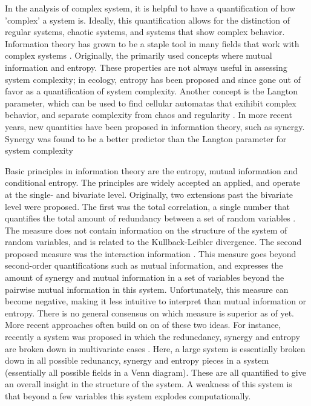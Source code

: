 \documentclass[../main.tex]{subfiles}
\begin{document}
In the analysis of complex system, it is helpful to have a quantification of how 'complex' a system is.
Ideally, this quantification allows for the distinction of regular systems, chaotic systems, and systems that show complex behavior.
Information theory has grown to be a staple tool in many fields that work with complex systems \cite{williams2010nonnegative}. %
Originally, the primarily used concepts where mutual information and entropy.
These properties are not always useful in assessing system complexity; in ecology, entropy has been proposed and since gone out of favor as a quantification of system complexity.
Another concept is the Langton parameter, which can be used to find cellular automatas that exihibit complex behavior, and separate complexity from chaos and regularity \cite{langton1990computation}.
In more recent years, new quantities have been proposed in information theory, such as synergy.
Synergy was found to be a better predictor than the Langton parameter for system complexity \cite{9999QuaxChli}

Basic principles in information theory are the entropy, mutual information and conditional entropy.
The principles are widely accepted an applied, and operate at the single- and bivariate level.
Originally, two extensions past the bivariate level were proposed.
The first was the total correlation, a single number that quantifies the total amount of redundancy between a set of random variables \cite{watanabe1960information}. 
The measure does not contain information on the structure of the system of random variables, and is related to the Kullback-Leibler divergence.
The second proposed measure was the interaction information \cite{mcgill1954multivariate}. This measure goes beyond second-order quantifications such as mutual information, and expresses the amount of synergy and mutual information in a set of variables beyond the pairwise mutual information in this system. 
Unfortunately, this measure can become negative, making it less intuitive to interpret than mutual information or entropy.
There is no general consensus on which measure is superior as of yet\cite{williams2010nonnegative}.
More recent approaches often build on on of these two ideas.
For instance, recently a system was proposed in which the reduncdancy, synergy and entropy are broken down in multivariate cases \cite{williams2010nonnegative}.
Here, a large system is essentially broken down in all possible redunancy, synergy and entropy pieces in a system (essentially all possible fields in a Venn diagram).
These are all quantified to give an overall insight in the structure of the system.
A weakness of this system is that beyond a few variables this system explodes computationally.
\end{document}
